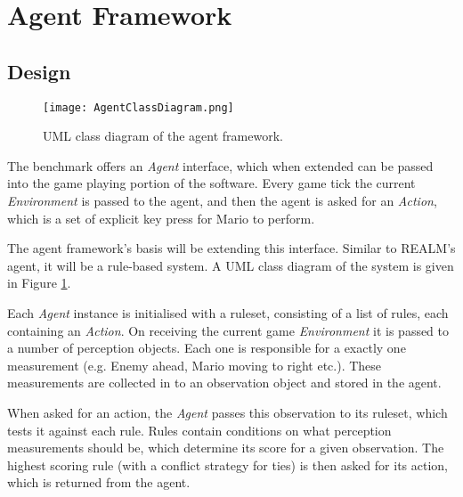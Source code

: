 
\section{Agent Framework}


\subsection{Design}
\label{subsec:agentdes}

\begin{figure}[t]
	\centering
	\texttt{[image: AgentClassDiagram.png]}
	\caption{UML class diagram of the agent framework.}
	\label{fig:aumlcd}
\end{figure}

The benchmark offers an \emph{Agent} interface, which when extended can be passed into the game playing portion of the software. Every game tick the current \emph{Environment} is passed to the agent, and then the agent is asked for an \emph{Action}, which is a set of explicit key press for Mario to perform.

The agent framework's basis will be extending this interface. Similar to REALM's agent, it will be a rule-based system. A UML class diagram of the system is given in Figure \ref{fig:aumlcd}.

\vspace{\baselineskip}

Each \emph{Agent} instance is initialised with a ruleset, consisting of a list of rules, each containing an \emph{Action}. On receiving the current game \emph{Environment} it is passed to a number of perception objects. Each one is responsible for a exactly one measurement (e.g. Enemy ahead, Mario moving to right etc.). These measurements are collected in to an observation object and stored in the agent.

When asked for an action, the \emph{Agent} passes this observation to its ruleset, which tests it against each rule. Rules contain conditions on what perception measurements should be, which determine its score for a given observation. The highest scoring rule (with a conflict strategy for ties) is then asked for its action, which is returned from the agent.

